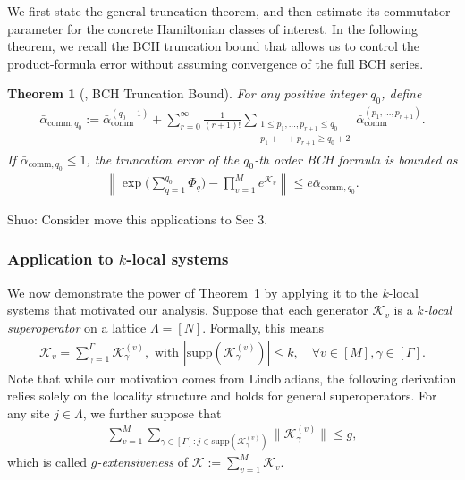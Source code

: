 \documentclass[aps,pra,reprint,groupedaddress,floatfix]{revtex4-2}
\newtheorem{theorem}{Theorem}
\newcommand{\thm}[1]{\hyperref[thm:#1]{Theorem~\ref*{thm:#1}}}
\renewcommand{\comm}{\mathrm{comm}}
\newcommand{\supp}{\mathrm{supp}}
\newcommand{\mc}{\mathcal}
\newcommand{\sz}[1]{{\color{blue} Shuo: #1}}
\begin{document}
We first state the general truncation theorem, and then estimate its commutator parameter for the concrete Hamiltonian classes of interest.
In the following theorem, we recall the BCH truncation bound that allows us to control the product-formula error without assuming convergence of the full BCH series.
\begin{theorem}[{\cite[Theorem~6]{wang2026lindbladiansimulationcommutatorbounds}}, BCH Truncation Bound]
 \label{thm:general-bch-truncation}
 For any positive integer $q_0$, define 
 \begin{align}
\label{eq:def-beta-comm-sum}
    \bar{\alpha}_{\comm,q_0} := \bar{\alpha}_{\comm}^{(q_0+1)} + \sum_{r = 0}^{\infty}\frac{1}{(r+1)!} \sum_{\substack{1\le p_1, \ldots, p_{r+1}\le q_0\\p_1+\cdots+p_{r+1} \ge q_0+2}}\bar{\alpha}_{\comm}^{(p_1, \ldots, p_{r+1})}.
\end{align}
 If $\bar{\alpha}_{\comm,q_0} \le 1$, the truncation error of the $q_0$-th order BCH formula is bounded as
 \begin{align*}
 \left\|\exp\Big(\sum_{q=1}^{q_0} \Phi_q\Big) - \prod_{v = 1}^Me^{\mc K_v} \right\| \le e\bar{\alpha}_{\comm,q_0}.
 \end{align*}
\end{theorem}


\sz{Consider move this applications to Sec 3. }
\subsubsection{Application to $k$-local systems}
\label{sec:k-local-example}

We now demonstrate the power of \thm{general-bch-truncation} by applying it to the $k$-local systems that motivated our analysis. Suppose that each generator $\mc K_v$ is a \emph{$k$-local superoperator} on a lattice $\Lambda = [N]$. Formally, this means
\begin{align*}
    \mc K_v = \sum_{\gamma = 1}^{\Gamma} \mc K_{\gamma}^{(v)}, \text{ with } |\supp(\mc K_{\gamma}^{(v)} )|\le k, \quad \forall v\in [M], \gamma\in [\Gamma].
\end{align*} 
Note that while our motivation comes from Lindbladians, the following derivation relies solely on the locality structure and holds for general superoperators.
For any site $j\in \Lambda$, we further suppose that 
\begin{align*}
    \sum_{v=1}^M\sum_{\gamma\in [\Gamma]: j\in \supp(\mc K_{\gamma}^{(v)})}\|\mc K_\gamma^{(v)}\|\le g,
\end{align*}
which is called \emph{$g$-extensiveness} of $\mc K:= \sum_{v=1}^M \mc K_v$.
\end{document}
